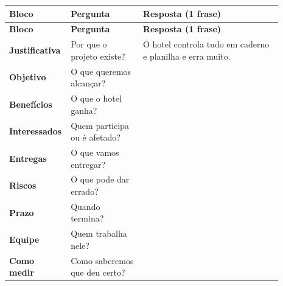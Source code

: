 \documentclass[11pt,a4paper]{article}
\begin{document}
\begin{longtable}{>{\raggedright\arraybackslash}p{0.120\linewidth}>{\raggedright\arraybackslash}p{0.267\linewidth}>{\raggedright\arraybackslash}p{0.506\linewidth}}
\rowcolor{cor} \color{white}\textbf{\footnotesize Bloco} & \color{white}\textbf{\footnotesize Pergunta} & \color{white}\textbf{\footnotesize Resposta (1 frase)} \\
\endfirsthead
\rowcolor{cor} \color{white}\textbf{\footnotesize Bloco} & \color{white}\textbf{\footnotesize Pergunta} & \color{white}\textbf{\footnotesize Resposta (1 frase)} \\
\endhead
\rowcolor{white}\textbf{Justificativa} & Por que o projeto existe? & O hotel controla tudo em caderno e planilha e erra muito. \\ \hline
\rowcolor{suave!55}\rule{0pt}{24pt}\textbf{Objetivo} & O que queremos alcançar? &  \\ \hline
\rowcolor{white}\rule{0pt}{24pt}\textbf{Benefícios} & O que o hotel ganha? &  \\ \hline
\rowcolor{suave!55}\rule{0pt}{24pt}\textbf{Interessados} & Quem participa ou é afetado? &  \\ \hline
\rowcolor{white}\rule{0pt}{24pt}\textbf{Entregas} & O que vamos entregar? &  \\ \hline
\rowcolor{suave!55}\rule{0pt}{24pt}\textbf{Riscos} & O que pode dar errado? &  \\ \hline
\rowcolor{white}\rule{0pt}{24pt}\textbf{Prazo} & Quando termina? &  \\ \hline
\rowcolor{suave!55}\rule{0pt}{24pt}\textbf{Equipe} & Quem trabalha nele? &  \\ \hline
\rowcolor{white}\rule{0pt}{24pt}\textbf{Como medir} & Como saberemos que deu certo? &  \\ \hline
\end{longtable}
\endgroup
\end{document}
